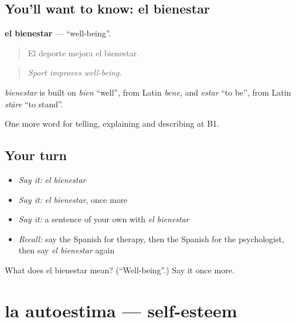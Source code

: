 \subsection*{You'll want to know: el bienestar}
\textbf{el bienestar} — \textquotedblleft{}well-being\textquotedblright{}.

\begin{quote}
El deporte mejora el bienestar.
\end{quote}

\begin{quote}
\emph{Sport improves well-being.}
\end{quote}

\begin{cousinweb}
\emph{bienestar} is built on \emph{bien} \textquotedblleft{}well\textquotedblright{}, from Latin \emph{bene}, and \emph{estar} \textquotedblleft{}to be\textquotedblright{}, from Latin \emph{stāre} \textquotedblleft{}to stand\textquotedblright{}.
\end{cousinweb}

\begin{grammarlens}[title={What you've built}]
One more word for telling, explaining and describing at B1.
\end{grammarlens}

\subsection*{Your turn}
\begin{itemize}
\raggedright
  \item \emph{Say it:} \emph{el bienestar}
  \item \emph{Say it:} \emph{el bienestar}, once more
  \item \emph{Say it:} a sentence of your own with \emph{el bienestar}
  \item \emph{Recall:} say the Spanish for therapy, then the Spanish for the psychologist, then say \emph{el bienestar} again
\end{itemize}

\begin{tcolorbox}[breakable,colback=teal!4,colframe=teal!35!black,title={Before you move on}]
What does el bienestar mean? (\textquotedblleft{}Well-being\textquotedblright{}.) Say it once more.
\end{tcolorbox}
\section[la autoestima]{la autoestima — self-esteem}


